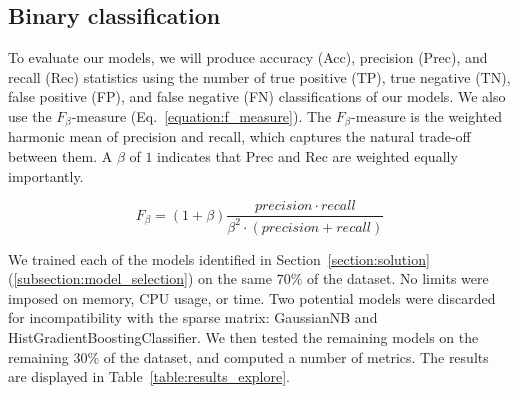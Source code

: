 \documentclass[12pt,a4paper]{article}
\begin{document}
\subsection{Binary classification}

To evaluate our models, we will produce accuracy (Acc), precision (Prec), and recall (Rec) statistics using the number of true positive (TP), true negative (TN), false positive (FP), and false negative (FN) classifications of our models. We also use the $F_\beta$-measure (Eq.~\ref{equation:f_measure}). The $F_\beta$-measure is the weighted harmonic mean of precision and recall, which captures the natural trade-off between them. A $\beta$ of $1$ indicates that Prec and Rec are weighted equally importantly.

\begin{equation}
\label{equation:f_measure}
F_\beta = (1 + \beta) \frac{precision \cdot recall}{\beta^2 \cdot (precision + recall)}
\end{equation}

 We trained each of the models identified in Section~\ref{section:solution} (\ref{subsection:model_selection}) on the same $70\%$ of the dataset. No limits were imposed on memory, CPU usage, or time. Two potential models were discarded for incompatibility with the sparse matrix: GaussianNB and HistGradientBoostingClassifier. We then tested the remaining models on the remaining $30\%$ of the dataset, and computed a number of metrics. The results are displayed in Table~\ref{table:results_explore}.
\end{document}
